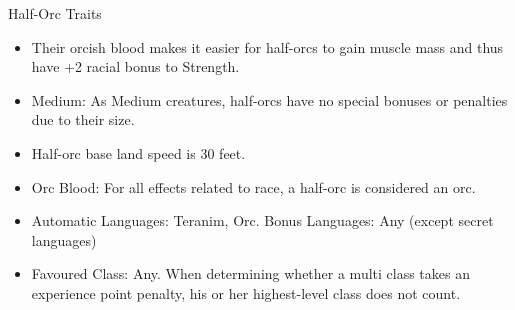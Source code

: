 \begin{35e}{Half-Orc Traits}
  \begin{itemize}[noitemsep]
    \item Their orcish blood makes it easier for half-orcs to gain muscle mass
      and thus have +2 racial bonus to Strength.
    \item Medium: As Medium creatures, half-orcs have no special bonuses or
      penalties due to their size.
    \item Half-orc base land speed is 30 feet.
    \item Orc Blood: For all effects related to race, a half-orc is considered
    an orc.
    \item Automatic Languages: Teranim, Orc. Bonus Languages: Any (except secret
      languages)
    \item Favoured Class: Any. When determining whether a multi class takes an
    experience point penalty, his or her highest-level class does not count.
  \end{itemize}
\end{35e}


